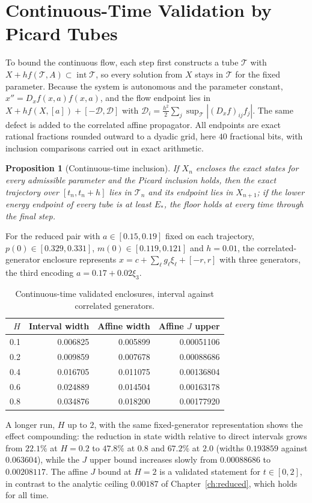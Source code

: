 \documentclass[11pt,notitlepage]{report}
\newtheorem{proposition}[theorem]{Proposition}
\theoremstyle{definition}
\theoremstyle{remark}
\begin{document}
\section{Continuous-Time Validation by Picard Tubes}
To bound the continuous flow, each step first constructs a tube $\mathcal T$ with $X+hf(\mathcal T,A)\subset\operatorname{int}\mathcal T$, so every solution from $X$ stays in $\mathcal T$ for the fixed parameter. Because the system is autonomous and the parameter constant, $x''=D_xf(x,a)f(x,a)$, and the flow endpoint lies in $X+hf(X,[a])+[-\mathcal D,\mathcal D]$ with $\mathcal D_i=\tfrac{h^2}2\sum_j\sup_{\mathcal T}|(D_xf)_{ij}f_j|$. The same defect is added to the correlated affine propagator. All endpoints are exact rational fractions rounded outward to a dyadic grid, here $40$ fractional bits, with inclusion comparisons carried out in exact arithmetic.
\begin{proposition}[Continuous-time inclusion]\label{prop:ctinclusion}
If $X_n$ encloses the exact states for every admissible parameter and the Picard inclusion holds, then the exact trajectory over $[t_n,t_n+h]$ lies in $\mathcal T_n$ and its endpoint lies in $X_{n+1}$; if the lower energy endpoint of every tube is at least $E_*$, the floor holds at every time through the final step.
\end{proposition}
For the reduced pair with $a\in[0.15,0.19]$ fixed on each trajectory, $p(0)\in[0.329,0.331]$, $m(0)\in[0.119,0.121]$ and $h=0.01$, the correlated-generator enclosure represents $x=c+\sum_\ell g_\ell\xi_\ell+[-r,r]$ with three generators, the third encoding $a=0.17+0.02\xi_3$.
\begin{table}[ht]\centering\small
\caption{Continuous-time validated enclosures, interval against correlated generators.}
\begin{tabular}{rrrr}\toprule
$H$&Interval width&Affine width&Affine $J$ upper\\\midrule
0.1&0.006825&0.005899&0.00051106\\
0.2&0.009859&0.007678&0.00088686\\
0.4&0.016705&0.011075&0.00136804\\
0.6&0.024889&0.014504&0.00163178\\
0.8&0.034876&0.018200&0.00177920\\\bottomrule
\end{tabular}
\end{table}
A longer run, $H$ up to $2$, with the same fixed-generator representation shows the effect compounding: the reduction in state width relative to direct intervals grows from $22.1\%$ at $H=0.2$ to $47.8\%$ at $0.8$ and $67.2\%$ at $2.0$ (widths $0.193859$ against $0.063604$), while the $J$ upper bound increases slowly from $0.00088686$ to $0.00208117$. The affine $J$ bound at $H=2$ is a validated statement for $t\in[0,2]$, in contrast to the analytic ceiling $0.00187$ of Chapter~\ref{ch:reduced}, which holds for all time.
\end{document}
